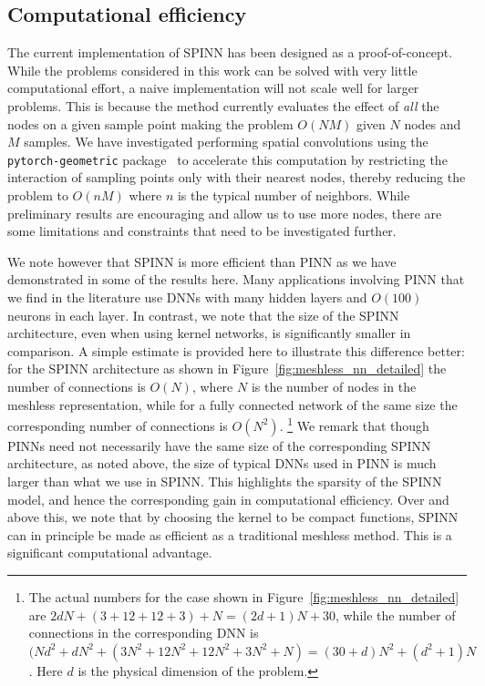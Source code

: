 \documentclass[12pt]{article}
\newcommand{\rr}[1]{#1}
\newcommand{\rb}[1]{#1}
\begin{document}
\subsection{Computational efficiency}
The current implementation of SPINN has been designed as a proof-of-concept.  While the problems considered in this work can be solved with very little computational effort, a naive implementation will not scale well for larger problems. This is because the method currently evaluates the effect of \emph{all} the nodes on a given sample point making the problem $O(NM)$ given $N$ nodes and $M$ samples.  We have investigated performing spatial convolutions using the \texttt{pytorch-geometric} package~\cite{pytorch_geometric} to accelerate this computation by restricting the interaction of sampling points only with their nearest nodes, thereby reducing the problem to $O(nM)$ where $n$ is the typical number of neighbors.  While preliminary results are encouraging and allow us to use more nodes, there are some limitations and constraints that need to be investigated further.

\rr{We note however that SPINN is more efficient than PINN as we have demonstrated in some of the results here. Many applications involving PINN that we find in the literature use DNNs with many hidden layers and $O(100)$ neurons in each layer. In contrast, we note that the size of the SPINN architecture, even when using kernel networks, is significantly smaller in comparison. A simple estimate is provided here to illustrate this difference better: for the SPINN architecture as shown in Figure~\ref{fig:meshless_nn_detailed} the number of connections is $O(N)$, where $N$ is the number of nodes in the meshless representation, while for a fully connected network of the same size the corresponding number of connections is $O(N^2)$. \footnote{The actual numbers for the case shown in Figure~\ref{fig:meshless_nn_detailed} are $2dN + (3 + 12 + 12 + 3) + N = (2d + 1)N + 30$, while the number of connections in the corresponding DNN is $(Nd^2 + dN^2 + (3N^2 + 12N^2 + 12N^2 + 3N^2 + N) = (30 + d)N^2 + (d^2 + 1)N$. Here $d$ is the physical dimension of the problem.} We remark that though PINNs need not necessarily have the same size of the corresponding SPINN architecture, as noted above, the size of typical DNNs used in PINN is much larger than what we use in SPINN.} This highlights the sparsity of the SPINN model, and hence the corresponding gain in computational efficiency. Over and above this, we note that by choosing the kernel to be compact functions, SPINN can \rb{in principle} be made as efficient as a traditional meshless method. This is a significant computational advantage.
\end{document}
